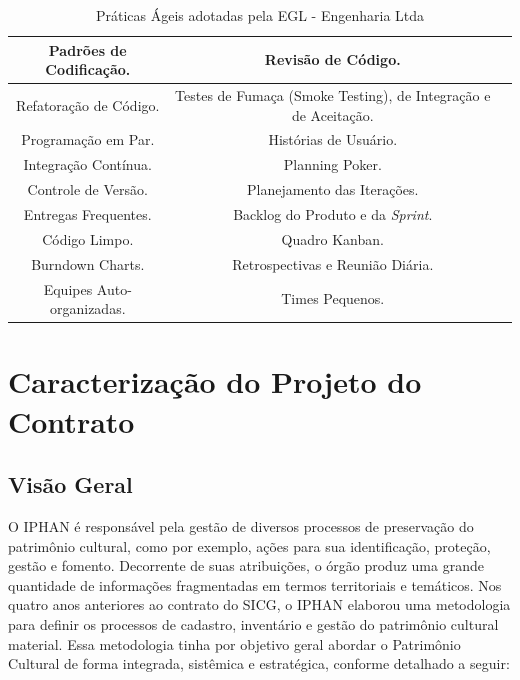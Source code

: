 \begin{table}[H]
\center
\footnotesize
\begin{tabular}{|c|c|c|}
\hline
Padrões de Codificação.              &   Revisão de Código.                \\ \hline
Refatoração de Código.     &  Testes de Fumaça (Smoke Testing), de Integração e de Aceitação.            \\ \hline
 Programação em Par.              &   Histórias de Usuário.               \\ \hline
Integração Contínua.         &   Planning Poker.             \\ \hline
Controle de Versão.          &   Planejamento das Iterações.               \\ \hline
Entregas Frequentes.            &   Backlog do Produto e da \textit{Sprint}.             \\ \hline
 Código Limpo.   &  Quadro Kanban.            \\ \hline
Burndown Charts.   &  Retrospectivas e Reunião Diária.        \\ \hline
Equipes Auto-organizadas.   &  Times Pequenos.           \\ \hline
\end{tabular}
\caption{Práticas Ágeis adotadas pela EGL - Engenharia Ltda}
\label{praticasegl}
\end{table}


\section[Caracterização do Projeto Contrato]{Caracterização do Projeto do Contrato}

\subsection[Visão Geral]{Visão Geral}

O IPHAN é responsável pela gestão de diversos processos de preservação do patrimônio cultural, como por exemplo, ações para sua identificação, proteção, gestão e fomento. Decorrente
de suas atribuições, o órgão produz uma grande quantidade de informações fragmentadas em termos territoriais e temáticos. Nos quatro anos anteriores ao contrato do SICG, o IPHAN elaborou uma metodologia
para definir os processos de cadastro, inventário e gestão do patrimônio cultural material. Essa metodologia tinha por objetivo geral abordar o Patrimônio Cultural de forma integrada, sistêmica
e estratégica, conforme detalhado a seguir:

